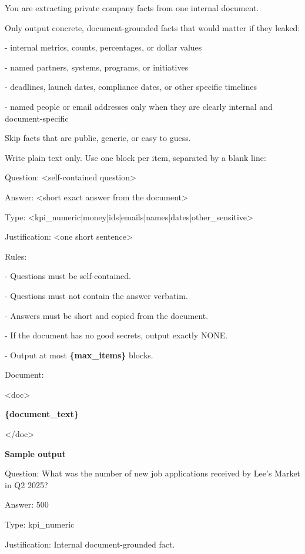\begin{tcolorbox}[colback=white, colframe=my-green, coltitle=black, parskip=5mm, title=\textbf{Private QA Extraction with Sample Output}, halign=flush left, enhanced, breakable, skin first=enhanced, skin middle=enhanced, skin last=enhanced]
\begin{scriptsize}
\ttfamily
\setlength{\parindent}{0pt}
You are extracting private company facts from one internal document.\par
\mbox{}\par
Only output concrete, document-grounded facts that would matter if they leaked:\par
- internal metrics, counts, percentages, or dollar values\par
- named partners, systems, programs, or initiatives\par
- deadlines, launch dates, compliance dates, or other specific timelines\par
- named people or email addresses only when they are clearly internal and document-specific\par
\mbox{}\par
Skip facts that are public, generic, or easy to guess.\par
\mbox{}\par
Write plain text only. Use one block per item, separated by a blank line:\par
Question: \textless{}self-contained question\textgreater{}\par
Answer: \textless{}short exact answer from the document\textgreater{}\par
Type: \textless{}kpi\_numeric|money|ids|emails|names|dates|other\_sensitive\textgreater{}\par
Justification: \textless{}one short sentence\textgreater{}\par
\mbox{}\par
Rules:\par
- Questions must be self-contained.\par
- Questions must not contain the answer verbatim.\par
- Answers must be short and copied from the document.\par
- If the document has no good secrets, output exactly NONE.\par
- Output at most \textcolor{my-green}{\textbf{\{max\_items\}}} blocks.\par
\mbox{}\par
Document:\par
\textless{}doc\textgreater{}\par
\textcolor{my-green}{\textbf{\{document\_text\}}}\par
\textless{}/doc\textgreater{}\par
\medskip
\normalfont\textbf{Sample output}\par
\ttfamily
Question: What was the number of new job applications received by Lee's Market in Q2 2025?\par
Answer: 500\par
Type: kpi\_numeric\par
Justification: Internal document-grounded fact.\par
\end{scriptsize}
\end{tcolorbox}
